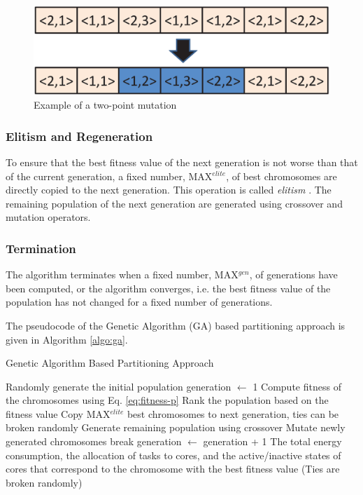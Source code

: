 \documentclass[conference]{IEEEtran}
\begin{document}
\begin{figure}[h]
	\begin{center}
		\includegraphics[scale=0.35]{mutation.eps}
	\end{center}
		\caption{Example of a two-point mutation}
	\label{fig:mutation}
\end{figure}


\subsubsection{Elitism and Regeneration} To ensure that the best fitness value of the next generation is not worse than that of the current generation,
a fixed number, MAX$^{elite}$, of best chromosomes are directly copied to the next generation. This operation is called \emph{elitism} \cite{Goldberg}.
The remaining population of the next generation are generated using crossover and mutation operators.


\subsubsection{Termination} The algorithm terminates when a fixed number, MAX$^{gen}$, of generations
have been computed, or the algorithm converges, i.e. the best fitness value of the population has not changed for a fixed number
of generations.

The pseudocode of the Genetic Algorithm (GA) based partitioning approach is given in Algorithm \ref{algo:ga}.

\begin{algorithm}
\caption{Genetic Algorithm Based Partitioning Approach} \label{algo:ga}
\footnotesize
\begin{algorithmic}[1]
\STATE Randomly generate the initial population
\STATE generation $\leftarrow$ 1
\STATE Compute fitness of the chromosomes using Eq. \ref{eq:fitness-p}
\STATE Rank the population based on the fitness value
\STATE Copy MAX$^{elite}$ best chromosomes to next generation, ties can be broken randomly
\STATE Generate remaining population using crossover
\STATE Mutate newly generated chromosomes
\STATE break
\ENDIF
\STATE generation  $\leftarrow$ generation  + 1
\ENDWHILE
\PRINT The total energy consumption, the allocation of tasks to cores, and the active/inactive states of cores that
correspond to the chromosome with the best fitness value (Ties are broken randomly)
\end{algorithmic}
\end{algorithm}
\end{document}
